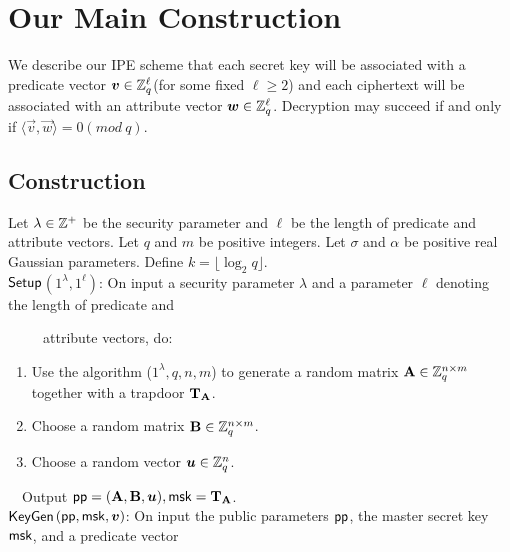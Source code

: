 \section{Our Main Construction}
We describe our IPE scheme that each secret key will be associated with a predicate vector $\boldsymbol{v} \in \mathbb{Z}^{\ell}_{q}$(for some fixed $\ell\geq 2$) and each ciphertext will be associated with an attribute vector $\boldsymbol{w} \in \mathbb{Z}^{\ell}_{q}$. Decryption may succeed if and only if $\langle \vec{v},\vec{w} \rangle=0 (mod\ q)$.
\subsection{Construction}
Let $\lambda \in \mathbb{Z}^{+}$ be the security parameter and $\ell$ be the length of predicate and attribute vectors. Let $q$ and $m$ be positive integers. Let $\sigma$ and $\alpha$ be positive real Gaussian parameters. Define $k=\lfloor \log_{2}q\rfloor$. \\[0.6cm]
$\mathsf{Setup}$$(1^{\lambda},1^{\ell})$: On input a security parameter $\lambda$ and a parameter $\ell$ denoting the length of predicate and

~~~~~attribute vectors, do:
\begin{enumerate}
\item Use the algorithm \trapgen ($1^{\lambda},q,n,m$) to generate a random matrix $\textbf{A} \in \mathbb{Z}^{n \times m}_{q}$ together with a trapdoor $\mathbf{T}_{\mathbf{A}}$.\

\item Choose a random matrix $\mathbf{B} \in \mathbb{Z}^{n \times m}_{q}$.\

\item Choose a random vector $\boldsymbol{u} \in \mathbb{Z}^{n}_{q}$.
\end{enumerate}
~~Output $\mathsf{pp}=(\mathbf{A}, \mathbf{B}, \boldsymbol{u}),\mathsf{msk}=\mathbf{T}_{\mathbf{A}}$.\\[0.4cm]
$\mathsf{KeyGen}$$(\mathsf{pp},\mathsf{msk},\boldsymbol{v})$: On input the public parameters $\mathsf{pp}$, the master secret key $\mathsf{msk}$, and a predicate vector


